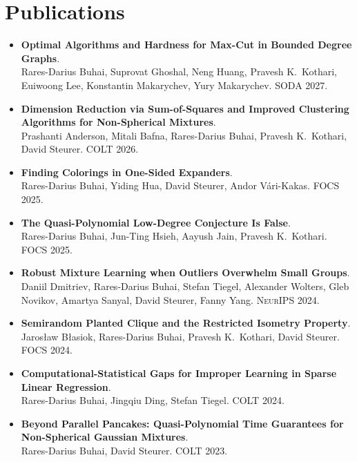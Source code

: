 \documentclass[11pt,a4paper]{article}
\begin{document}
\section*{Publications}
\begin{itemize}
  \item {}\textbf{Optimal Algorithms and Hardness for Max-Cut in Bounded Degree Graphs}.\\
  Rares-Darius Buhai, Suprovat Ghoshal, Neng Huang, Pravesh K.\ Kothari, Euiwoong Lee, Konstantin Makarychev, Yury Makarychev. \textsc{SODA} 2027.
  \item {}\textbf{Dimension Reduction via Sum-of-Squares and Improved Clustering Algorithms for Non-Spherical Mixtures}.\\
  Prashanti Anderson, Mitali Bafna, Rares-Darius Buhai, Pravesh K.\ Kothari, David Steurer. \textsc{COLT} 2026.
  \item {}\textbf{Finding Colorings in One-Sided Expanders}.\\
  Rares-Darius Buhai, Yiding Hua, David Steurer, Andor V\'{a}ri-Kakas. \textsc{FOCS} 2025.
  \item {}\textbf{The Quasi-Polynomial Low-Degree Conjecture Is False}.\\
  Rares-Darius Buhai, Jun-Ting Hsieh, Aayush Jain, Pravesh K.\ Kothari. \textsc{FOCS} 2025.
  \item {}\textbf{Robust Mixture Learning when Outliers Overwhelm Small Groups}.\\
  Daniil Dmitriev, Rares-Darius Buhai, Stefan Tiegel, Alexander Wolters, Gleb Novikov, Amartya Sanyal, David Steurer, Fanny Yang. \textsc{NeurIPS} 2024.
  \item {}\textbf{Semirandom Planted Clique and the Restricted Isometry Property}.\\
  Jaros\l aw B\l asiok, Rares-Darius Buhai, Pravesh K.\ Kothari, David Steurer. \textsc{FOCS} 2024.
  \item {}\textbf{Computational-Statistical Gaps for Improper Learning in Sparse Linear Regression}.\\
  Rares-Darius Buhai, Jingqiu Ding, Stefan Tiegel. \textsc{COLT} 2024.
  \item {}\textbf{Beyond Parallel Pancakes: Quasi-Polynomial Time Guarantees for Non-Spherical Gaussian Mixtures}.\\
  Rares-Darius Buhai, David Steurer. \textsc{COLT} 2023.

\end{itemize}
\end{document}
